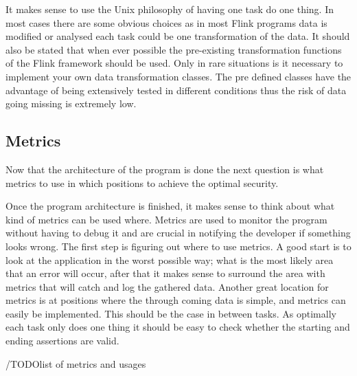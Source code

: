 It makes sense to use the Unix philosophy of having one task do one thing. In most cases there are some obvious choices as in most Flink programs data is modified or analysed each task could be one transformation of the data. It should also be stated that when ever possible the pre-existing transformation functions of the Flink framework should be used. Only in rare situations is it necessary to implement your own data transformation classes. The pre defined classes have the advantage of being extensively tested in different conditions thus the risk of data going missing is extremely low.

\subsection{Metrics}
Now that the architecture of the program is done the next question is what metrics to use in which positions to achieve the optimal security.

Once the program architecture is finished, it makes sense to think about what kind of metrics can be used where. Metrics are used to monitor the program without having to debug it and are crucial in notifying the developer if something looks wrong. The first step is figuring out where to use metrics. A good start is to look at the application in the worst possible way; what is the most likely area that an error will occur, after that it makes sense to surround the area with metrics that will catch and log the gathered data. Another great location for metrics is at positions where the through coming data is simple, and metrics can easily be implemented. This should be the case in between tasks. As optimally each task only does one thing it should be easy to check whether the starting and ending assertions are valid.

/TODO{list of metrics and usages}

